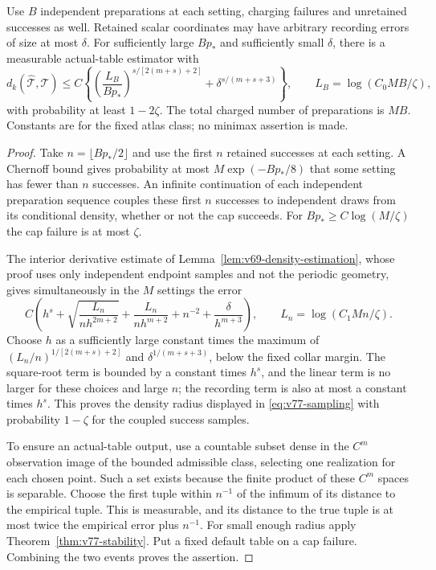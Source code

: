 \begin{corollary}
\label{cor:v77-sampling}
Use $B$ independent preparations at each setting, charging failures and
unretained successes as well.  Retained scalar coordinates may have
arbitrary recording errors of size at most $\delta$.  For sufficiently
large $Bp_*$ and sufficiently small $\delta$, there is a measurable
actual-table estimator with
\begin{equation}\label{eq:v77-sampling}
 d_k(\widehat{\mathcal T},\mathcal T)
 \le C\left\{
 \left(\frac{L_B}{Bp_*}\right)^{s/[2(m+s)+2]}
       +\delta^{s/(m+s+3)}\right\},\qquad
 L_B=\log(C_0MB/\zeta),
\end{equation}
with probability at least $1-2\zeta$.  The total charged number of
preparations is $MB$.  Constants are for the fixed atlas class; no
minimax assertion is made.
\end{corollary}
\begin{proof}
Take $n=\lfloor Bp_*/2\rfloor$ and use the first $n$ retained
successes at each setting.  A Chernoff bound gives probability at most
$M\exp(-Bp_*/8)$ that some setting has fewer than $n$ successes.
An infinite continuation of each independent preparation sequence
couples these first $n$ successes to independent draws from its
conditional density, whether or not the cap succeeds.  For
$Bp_*\ge C\log(M/\zeta)$ the cap failure is at most $\zeta$.

The interior derivative estimate of
Lemma~\ref{lem:v69-density-estimation}, whose proof uses only
independent endpoint samples and not the periodic geometry, gives
simultaneously in the $M$ settings the error
\[
 C\left(h^s+\sqrt{\frac{L_n}{nh^{2m+2}}}
    +\frac{L_n}{nh^{m+2}}+n^{-2}+\frac{\delta}{h^{m+3}}\right),
 \qquad L_n=\log(C_1Mn/\zeta).
\]
Choose $h$ as a sufficiently large constant times the maximum of
$(L_n/n)^{1/[2(m+s)+2]}$ and
$\delta^{1/(m+s+3)}$, below the fixed collar margin.
The square-root term is bounded by a constant times $h^s$, and the
linear term is no larger for these choices and large $n$; the recording
term is also at most a constant times $h^s$.  This proves the density
radius displayed in \eqref{eq:v77-sampling} with probability
$1-\zeta$ for the coupled success samples.

To ensure an actual-table output, use a countable subset dense in the
$C^m$ observation image of the bounded admissible class, selecting one
realization for each chosen point.  Such a set exists because the finite
product of these $C^m$ spaces is separable.  Choose the first tuple
within $n^{-1}$ of the infimum of its distance to the empirical tuple.
This is measurable, and its distance to the true tuple is at most twice
the empirical error plus $n^{-1}$.  For small enough radius apply
Theorem~\ref{thm:v77-stability}.  Put a fixed default table on a cap
failure.  Combining the two events proves the assertion.
\end{proof}

